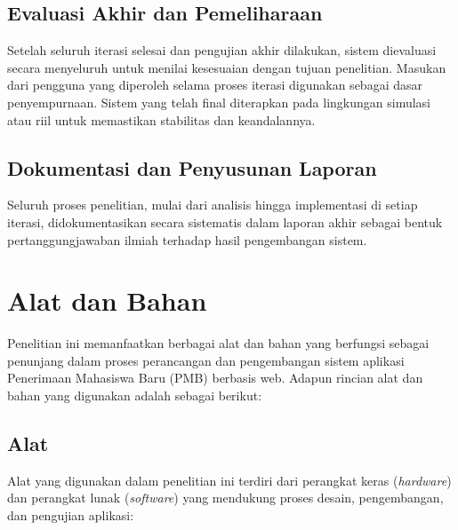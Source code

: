\subsection{Evaluasi Akhir dan Pemeliharaan} \label{III.Pemeliharaan}
Setelah seluruh iterasi selesai dan pengujian akhir dilakukan, sistem dievaluasi secara menyeluruh untuk menilai kesesuaian dengan tujuan penelitian. Masukan dari pengguna yang diperoleh selama proses iterasi digunakan sebagai dasar penyempurnaan. Sistem yang telah final diterapkan pada lingkungan simulasi atau riil untuk memastikan stabilitas dan keandalannya.\par

\subsection{Dokumentasi dan Penyusunan Laporan} \label{III.Dokumentasi}
Seluruh proses penelitian, mulai dari analisis hingga implementasi di setiap iterasi, didokumentasikan secara sistematis dalam laporan akhir sebagai bentuk pertanggungjawaban ilmiah terhadap hasil pengembangan sistem.\par

\section{Alat dan Bahan} \label{III.AlatBahan}
Penelitian ini memanfaatkan berbagai alat dan bahan yang berfungsi sebagai penunjang dalam proses perancangan dan pengembangan sistem aplikasi Penerimaan Mahasiswa Baru (PMB) berbasis web. Adapun rincian alat dan bahan yang digunakan adalah sebagai berikut:\par

\subsection{Alat} \label{III.Alat}
Alat yang digunakan dalam penelitian ini terdiri dari perangkat keras (\textit{hardware}) dan perangkat lunak (\textit{software}) yang mendukung proses desain, pengembangan, dan pengujian aplikasi:\par

